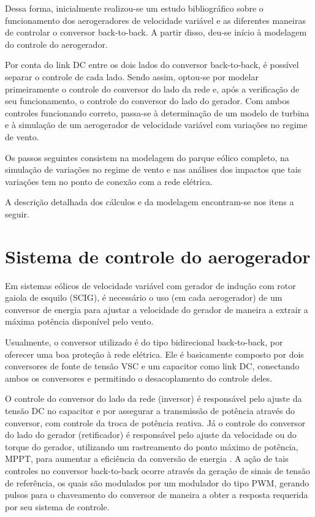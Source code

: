 Dessa forma, inicialmente realizou-se um estudo bibliográfico sobre o funcionamento dos aerogeradores de velocidade variável e as diferentes maneiras de controlar o conversor back-to-back. A partir disso, deu-se início à modelagem do controle do aerogerador.

Por conta do link DC entre os dois lados do conversor back-to-back, é possível separar o controle de cada lado. Sendo assim, optou-se por modelar primeiramente o controle do conversor do lado da rede e, após a verificação de seu funcionamento, o controle do conversor do lado do gerador.
Com ambos controles funcionando correto, passa-se à determinação de um modelo de turbina e à simulação de um aerogerador de velocidade variável com variações no regime de vento.

Os passos seguintes consistem na modelagem do parque eólico completo, na simulação de variações no regime de vento e nas análises dos impactos que tais variações tem no ponto de conexão com a rede elétrica.

A descrição detalhada dos cálculos e da modelagem encontram-se nos itens a seguir.




\section{Sistema de controle do aerogerador}
\label{sec:sistcontrol}


Em sistemas eólicos de velocidade variável com gerador de indução com rotor gaiola de esquilo (\ac{SCIG}), é necessário o uso (em cada aerogerador) de um conversor de energia para ajustar a velocidade do gerador de maneira a extrair a máxima potência disponível pelo vento.

Usualmente, o conversor utilizado é do tipo bidirecional back-to-back, por oferecer uma boa proteção à rede elétrica. Ele é basicamente composto por dois conversores de fonte de tensão \ac{VSC} e um capacitor como link DC, conectando ambos os conversores e permitindo o desacoplamento do controle deles.

O controle do conversor do lado da rede (inversor) é responsável pelo ajuste da tensão DC no capacitor e por assegurar a transmissão de potência através do conversor, com controle da troca de potência reativa. Já o controle do conversor do lado do gerador (retificador) é responsável pelo ajuste da velocidade ou do torque do gerador, utilizando um rastreamento do ponto máximo de potência, \ac{MPPT}, para aumentar a eficiência da conversão de energia \cite{wu2011power}. A ação de tais controles no conversor back-to-back ocorre através da geração de sinais de tensão de referência, os quais são modulados por um modulador do tipo \ac{PWM}, gerando pulsos para o chaveamento do conversor de maneira a obter a resposta requerida por seu sistema de controle.



